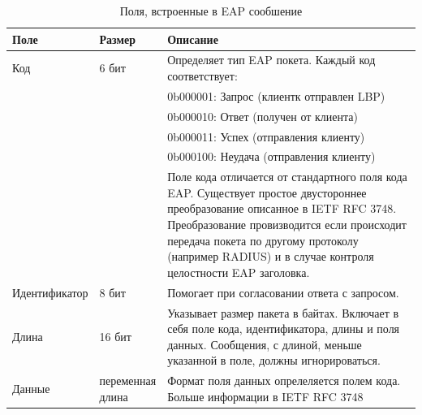 \begin{longtable}[\textwidth]{|p{0.21\linewidth}|p{0.15\linewidth}|p{0.64\linewidth}|}
\caption{Поля, встроенные в EAP сообшение} \\ %
\hline
Поле & Размер & Описание \\ \hline
Код & 6 бит & Определяет тип EAP покета. Каждый код соответствует: \\
& & 0b000001: Запрос (клиентк отправлен LBP) \\
& & 0b000010: Ответ (получен от клиента) \\
& & 0b000011: Успех (отправления клиенту) \\
& & 0b000100: Неудача (отправления клиенту) \\
& & Поле кода отличается от стандартного поля кода EAP. Существует простое двустороннее преобразование описанное в IETF RFC 3748. Преобразование провизводится если происходит передача покета по другому протоколу (например RADIUS) и в случае контроля целостности EAP заголовка. \\ \hline
Идентификатор &  8 бит & Помогает при согласовании ответа с запросом. \\ \hline
Длина & 16 бит & Указывает размер пакета в байтах. Включает в себя поле кода, идентификатора, длины и поля данных. Сообщения, с длиной, меньше указанной в поле, должны игнорироваться. \\ \hline
Данные & переменная длина & Формат поля данных опрелеляется полем кода. Больше информации в IETF RFC 3748 \\ \hline
\end{longtable}
